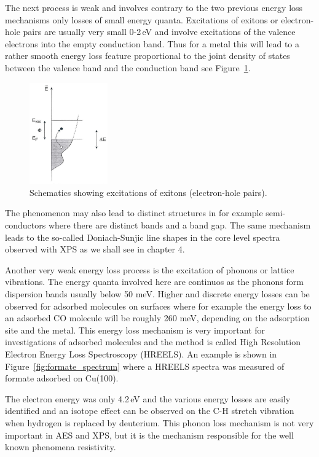The next process is weak and involves contrary to the two previous energy loss mechanisms only losses of small energy quanta. Excitations of exitons or electron-hole pairs are usually very small 0-2\,eV and involve excitations of the valence electrons into the empty conduction band. Thus for a metal this will lead to a rather smooth energy loss feature proportional to the joint density of states between the valence band and the conduction band see Figure~\ref{fig:schem_exitons}.

\begin{figure}[htbp]
\centering
\includegraphics[width=0.3\textwidth]{figures/02_12}
\caption{Schematics showing excitations of exitons (electron-hole pairs).}
\label{fig:schem_exitons}
\end{figure}

The phenomenon may also lead to distinct structures in for example semi-conductors where there are distinct bands and a band gap. The same mechanism leads to the so-called Doniach-Sunjic line shapes in the core level spectra observed with XPS as we shall see in chapter 4.

Another very weak energy loss process is the excitation of phonons or lattice vibrations. The energy quanta involved here are continuos as the phonons form dispersion bands usually below 50 meV. Higher and discrete energy losses can be observed for adsorbed molecules on surfaces where for example the energy loss to an adsorbed CO molecule will be roughly 260 meV, depending on the adsorption site and the metal. This energy loss mechanism is very important for investigations of adsorbed molecules and the method is called High Resolution Electron Energy Loss Spectroscopy (HREELS). An example is shown in Figure~\ref{fig:formate_spectrum} where a HREELS spectra was measured of formate adsorbed on Cu(100).

The electron energy was only 4.2\,eV and the various energy losses are easily identified and an isotope effect can be observed on the C-H stretch vibration when hydrogen is replaced by deuterium. This phonon loss mechanism is not very important in AES and XPS, but it is the mechanism responsible for the well known phenomena resistivity.

